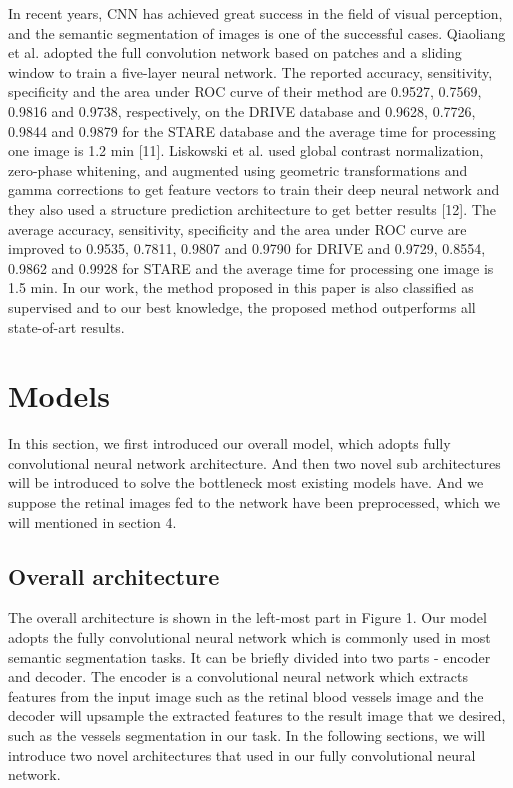 \documentclass{article}
\begin{document}
In recent years, CNN has achieved great success in the field of visual perception, and the semantic segmentation of images is one of the successful cases. Qiaoliang et al. adopted the full convolution network based on patches and a sliding window to train a five-layer neural network. The reported accuracy, sensitivity, specificity and the area under ROC curve of their method are 0.9527, 0.7569, 0.9816 and 0.9738, respectively, on the DRIVE database and 0.9628, 0.7726, 0.9844 and 0.9879 for the STARE database and the average time for processing one image is 1.2 min [11]. Liskowski et al. used global contrast normalization, zero-phase whitening, and augmented using geometric transformations and gamma corrections to get feature vectors to train their deep neural network and they also used a structure prediction architecture to get better results [12]. The average accuracy, sensitivity, specificity and the area under ROC curve are improved to 0.9535, 0.7811, 0.9807 and 0.9790 for DRIVE and 0.9729, 0.8554, 0.9862 and 0.9928 for STARE and the average time for processing one image is 1.5 min. In our work, the method proposed in this paper is also classified as supervised and to our best knowledge, the proposed method outperforms all state-of-art results.

\section{Models}

In this section, we first introduced our overall model, which adopts fully convolutional neural network architecture. And then two novel sub architectures will be introduced to solve the bottleneck most existing models have. And we suppose the retinal images fed to the network have been preprocessed, which we will mentioned in section 4.

\subsection{Overall architecture}

The overall architecture is shown in the left-most part in Figure 1. Our model adopts the fully convolutional neural network which is commonly used in most semantic segmentation tasks. It can be briefly divided into two parts - encoder and decoder. The encoder is a convolutional neural network which extracts features from the input image such as the retinal blood vessels image and the decoder will upsample the extracted features to the result image that we desired, such as the vessels segmentation in our task. In the following sections, we will introduce two novel architectures that used in our fully convolutional neural network.
\end{document}
